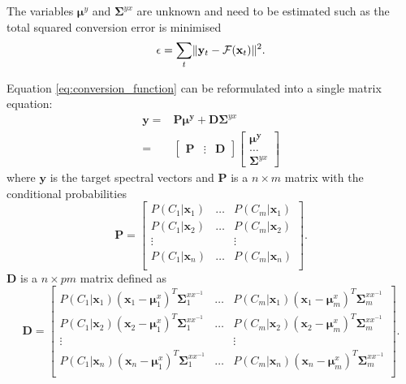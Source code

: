 The variables $\boldsymbol{\mu}^y$ and $\mathbf{\Sigma}^{yx}$ are unknown and need to be estimated such as the total squared conversion error is minimised
\begin{equation}
	\label{eq:conversion_error}
	\epsilon = \sum_{t} \lVert\mathbf{y}_t - \mathcal{F}(\mathbf{x}_t)\rVert^2.
\end{equation}

Equation \eqref{eq:conversion_function} can be reformulated into a single matrix equation:
\begin{equation}
	\label{eq:least_square_problem}
	\begin{split}
		\mathbf{y} = &\mathbf{P}\boldsymbol{\mu^y} + \mathbf{D}\mathbf{\Sigma}^{yx} \\
		= & \begin{bmatrix}
			\mathbf{P}& \vdots &\mathbf{D}
		\end{bmatrix}
		\begin{bmatrix}
			\boldsymbol{\mu^y} \\
			\dots \\
			\mathbf{\Sigma}^{yx}
		\end{bmatrix}
	\end{split}
\end{equation}
where $\mathbf{y}$ is the target spectral vectors and $\mathbf{P}$ is a $n \times m$ matrix with the conditional probabilities
\begin{equation}
	\label{eq:P_matrix}
	\mathbf{P} = \begin{bmatrix}
		P(C_1\vert \mathbf{x}_1) & \dots & P(C_m\vert \mathbf{x}_1) \\
		P(C_1\vert \mathbf{x}_2) & \dots & P(C_m\vert \mathbf{x}_2) \\
		\vdots & & \vdots \\
		P(C_1\vert \mathbf{x}_n) & \dots & P(C_m\vert \mathbf{x}_n) \\
	\end{bmatrix}.
\end{equation}
$\mathbf{D}$ is a $n \times pm$ matrix defined as
\begin{equation}
	\label{eq:D_matrix}
	\mathbf{D} = \begin{bmatrix}
		P(C_1\vert \mathbf{x}_1)(\mathbf{x}_1 - \boldsymbol{\mu}_1^x)^T\mathbf{\Sigma}_1^{xx^{-1}} & \dots & P(C_m\vert \mathbf{x}_1)(\mathbf{x}_1 - \boldsymbol{\mu}_m^x)^T\mathbf{\Sigma}_m^{xx^{-1}} \\
		P(C_1\vert \mathbf{x}_2)(\mathbf{x}_2 - \boldsymbol{\mu}_1^x)^T\mathbf{\Sigma}_1^{xx^{-1}} & \dots & P(C_m\vert \mathbf{x}_2)(\mathbf{x}_2 - \boldsymbol{\mu}_m^x)^T\mathbf{\Sigma}_m^{xx^{-1}} \\
		\vdots & & \vdots \\
		P(C_1\vert \mathbf{x}_n)(\mathbf{x}_n - \boldsymbol{\mu}_1^x)^T\mathbf{\Sigma}_1^{xx^{-1}} & \dots & P(C_m\vert \mathbf{x}_n)(\mathbf{x}_n - \boldsymbol{\mu}_m^x)^T\mathbf{\Sigma}_m^{xx^{-1}} \\
	\end{bmatrix}.
\end{equation}


